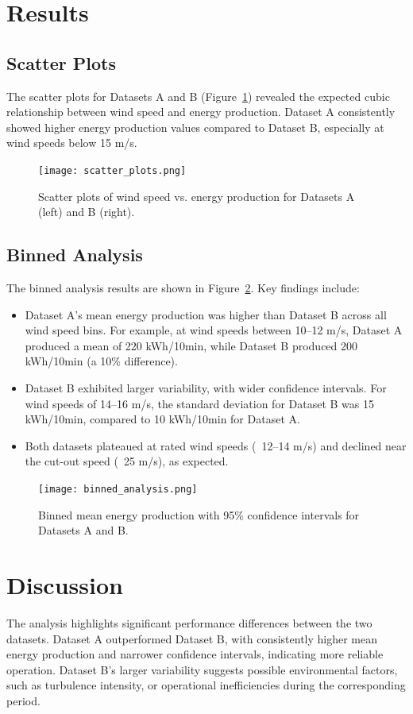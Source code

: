 \documentclass[a4paper,11pt]{article}
\begin{document}
\section*{Results}
\subsection*{Scatter Plots}
The scatter plots for Datasets A and B (Figure~\ref{fig:scatter}) revealed the expected cubic relationship between wind speed and energy production. Dataset A consistently showed higher energy production values compared to Dataset B, especially at wind speeds below 15 m/s.

\begin{figure}[H]
    \centering
    \texttt{[image: scatter\_plots.png]} %
    \caption{Scatter plots of wind speed vs. energy production for Datasets A (left) and B (right).}
    \label{fig:scatter}
\end{figure}


\subsection*{Binned Analysis}
The binned analysis results are shown in Figure~\ref{fig:binned}. Key findings include:
\begin{itemize}
    \item Dataset A's mean energy production was higher than Dataset B across all wind speed bins. For example, at wind speeds between 10--12 m/s, Dataset A produced a mean of 220 kWh/10min, while Dataset B produced 200 kWh/10min (a 10\% difference).
    \item Dataset B exhibited larger variability, with wider confidence intervals. For wind speeds of 14--16 m/s, the standard deviation for Dataset B was 15 kWh/10min, compared to 10 kWh/10min for Dataset A.
    \item Both datasets plateaued at rated wind speeds (~12--14 m/s) and declined near the cut-out speed (~25 m/s), as expected.
\end{itemize}

\begin{figure}[H]
    \centering
    \texttt{[image: binned\_analysis.png]} %
    \caption{Binned mean energy production with 95\% confidence intervals for Datasets A and B.}
    \label{fig:binned}
\end{figure}

\section*{Discussion}
The analysis highlights significant performance differences between the two datasets. Dataset A outperformed Dataset B, with consistently higher mean energy production and narrower confidence intervals, indicating more reliable operation. Dataset B's larger variability suggests possible environmental factors, such as turbulence intensity, or operational inefficiencies during the corresponding period.
\end{document}
